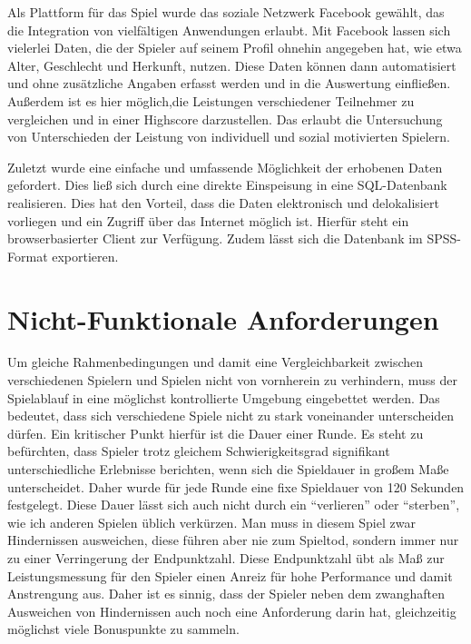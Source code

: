 \documentclass[a4paper,12pt]{scrartcl}
\begin{document}
Als Plattform für das Spiel wurde das soziale Netzwerk Facebook gewählt, das die
Integration von vielfältigen Anwendungen erlaubt. Mit Facebook lassen sich vielerlei Daten,
die der Spieler auf seinem Profil ohnehin angegeben hat, wie etwa Alter, Geschlecht und
Herkunft, nutzen. Diese Daten können dann automatisiert und ohne zusätzliche Angaben
erfasst werden und in die Auswertung einfließen.\newline
Außerdem ist es hier möglich,die Leistungen verschiedener Teilnehmer zu vergleichen
und in einer Highscore darzustellen. Das erlaubt die Untersuchung von Unterschieden der
Leistung von individuell und sozial motivierten Spielern.

Zuletzt wurde eine einfache und umfassende Möglichkeit der erhobenen Daten gefordert.
Dies ließ sich durch eine direkte Einspeisung in eine SQL-Datenbank realisieren. Dies hat
den Vorteil, dass die Daten elektronisch und delokalisiert vorliegen und ein Zugriff über das
Internet möglich ist. Hierfür steht ein browserbasierter Client zur Verfügung. Zudem lässt
sich die Datenbank im SPSS-Format exportieren.


\section{Nicht-Funktionale Anforderungen}
Um gleiche Rahmenbedingungen und damit eine Vergleichbarkeit zwischen verschiedenen
Spielern und Spielen nicht von vornherein zu verhindern, muss der Spielablauf in
eine möglichst kontrollierte Umgebung eingebettet werden. Das bedeutet, dass sich
verschiedene Spiele nicht zu stark voneinander unterscheiden dürfen. Ein kritischer Punkt
hierfür ist die Dauer einer Runde. Es steht zu befürchten, dass Spieler trotz gleichem
Schwierigkeitsgrad signifikant unterschiedliche Erlebnisse berichten, wenn sich die
Spieldauer in großem Maße unterscheidet. Daher wurde für jede Runde eine fixe Spieldauer
von 120 Sekunden festgelegt. Diese Dauer lässt sich auch nicht durch ein "`verlieren"'
oder "`sterben"', wie ich anderen Spielen üblich verkürzen. Man muss in diesem Spiel zwar
Hindernissen ausweichen, diese führen aber nie zum Spieltod, sondern immer nur zu einer
Verringerung der Endpunktzahl. Diese Endpunktzahl übt als Maß zur Leistungsmessung für
den Spieler einen Anreiz für hohe Performance und damit Anstrengung aus. Daher ist es
sinnig, dass der Spieler neben dem zwanghaften Ausweichen von Hindernissen auch noch
eine Anforderung darin hat, gleichzeitig möglichst viele Bonuspunkte zu sammeln.
\end{document}
